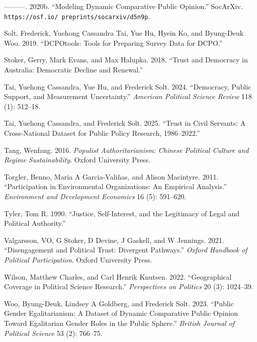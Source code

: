 \documentclass[
  12pt,
]{article}
\newlength{\cslhangindent}
\newenvironment{CSLReferences}[2] %
 {\begin{list}{}{%
  \setlength{\itemindent}{0pt}
  \setlength{\leftmargin}{0pt}
  \setlength{\parsep}{0pt}
  \ifodd #1
   \setlength{\leftmargin}{\cslhangindent}
   \setlength{\itemindent}{-1\cslhangindent}
  \fi
  \setlength{\itemsep}{#2\baselineskip}}}
 {\end{list}}
\begin{document}
\begin{CSLReferences}{1}{0}
---------. 2020b. {``Modeling Dynamic Comparative Public Opinion.''} SocArXiv. \texttt{https://osf.io/\ preprints/socarxiv/d5n9p}.

Solt, Frederick, Yuehong Cassandra Tai, Yue Hu, Hyein Ko, and Byung-Deuk Woo. 2019. {``DCPOtools: Tools for Preparing Survey Data for DCPO.''}

Stoker, Gerry, Mark Evans, and Max Halupka. 2018. {``Trust and Democracy in Australia: Democratic Decline and Renewal.''}

Tai, Yuehong Cassandra, Yue Hu, and Frederick Solt. 2024. {``Democracy, Public Support, and Measurement Uncertainty.''} \emph{American Political Science Review} 118 (1): 512--18.

Tai, Yuehong Cassandra, and Frederick Solt. 2025. {``Trust in Civil Servants: A Cross-National Dataset for Public Policy Research, 1986--2022.''}

Tang, Wenfang. 2016. \emph{Populist Authoritarianism: Chinese Political Culture and Regime Sustainability}. Oxford University Press.

Torgler, Benno, Maria A Garcia-Valiñas, and Alison Macintyre. 2011. {``Participation in Environmental Organizations: An Empirical Analysis.''} \emph{Environment and Development Economics} 16 (5): 591--620.

Tyler, Tom R. 1990. {``Justice, Self-Interest, and the Legitimacy of Legal and Political Authority.''}

Valgarsson, VO, G Stoker, D Devine, J Gaskell, and W Jennings. 2021. {``Disengagement and Political Trust: Divergent Pathways.''} \emph{Oxford Handbook of Political Participation}. Oxford University Press.

Wilson, Matthew Charles, and Carl Henrik Knutsen. 2022. {``Geographical Coverage in Political Science Research.''} \emph{Perspectives on Politics} 20 (3): 1024--39.

Woo, Byung-Deuk, Lindsey A Goldberg, and Frederick Solt. 2023. {``Public Gender Egalitarianism: A Dataset of Dynamic Comparative Public Opinion Toward Egalitarian Gender Roles in the Public Sphere.''} \emph{British Journal of Political Science} 53 (2): 766--75.


\end{CSLReferences}
\end{document}

